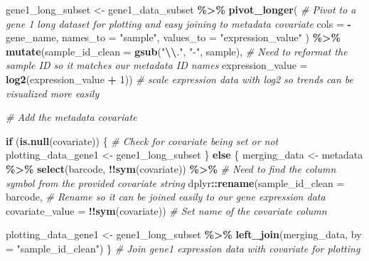 \documentclass[
]{article}
\newenvironment{Shaded}{\begin{snugshade}}{\end{snugshade}}
\newcommand{\AttributeTok}[1]{\textcolor[rgb]{0.13,0.29,0.53}{#1}}
\newcommand{\CommentTok}[1]{\textcolor[rgb]{0.56,0.35,0.01}{\textit{#1}}}
\newcommand{\ControlFlowTok}[1]{\textcolor[rgb]{0.13,0.29,0.53}{\textbf{#1}}}
\newcommand{\DecValTok}[1]{\textcolor[rgb]{0.00,0.00,0.81}{#1}}
\newcommand{\FunctionTok}[1]{\textcolor[rgb]{0.13,0.29,0.53}{\textbf{#1}}}
\newcommand{\NormalTok}[1]{#1}
\newcommand{\OtherTok}[1]{\textcolor[rgb]{0.56,0.35,0.01}{#1}}
\newcommand{\SpecialCharTok}[1]{\textcolor[rgb]{0.81,0.36,0.00}{\textbf{#1}}}
\newcommand{\StringTok}[1]{\textcolor[rgb]{0.31,0.60,0.02}{#1}}
\begin{document}
\begin{Shaded}
\begin{Highlighting}[]
\NormalTok{  gene1\_long\_subset }\OtherTok{\textless{}{-}}\NormalTok{ gene1\_data\_subset }\SpecialCharTok{\%\textgreater{}\%}
  \FunctionTok{pivot\_longer}\NormalTok{( }\CommentTok{\# Pivot to a gene 1 long dataset for plotting and easy joining to metadata covariate}
    \AttributeTok{cols =} \SpecialCharTok{{-}}\NormalTok{gene\_name,}
    \AttributeTok{names\_to =} \StringTok{"sample"}\NormalTok{,}
    \AttributeTok{values\_to =} \StringTok{"expression\_value"}
\NormalTok{  ) }\SpecialCharTok{\%\textgreater{}\%} 
  \FunctionTok{mutate}\NormalTok{(}\AttributeTok{sample\_id\_clean =} \FunctionTok{gsub}\NormalTok{(}\StringTok{"}\SpecialCharTok{\textbackslash{}\textbackslash{}}\StringTok{."}\NormalTok{, }\StringTok{"{-}"}\NormalTok{, sample), }\CommentTok{\# Need to reformat the sample ID so it matches our metadata ID names}
         \AttributeTok{expression\_value =} \FunctionTok{log2}\NormalTok{(expression\_value }\SpecialCharTok{+} \DecValTok{1}\NormalTok{)) }\CommentTok{\# scale expression data with log2 so trends can be visualized more easily}
  
  \CommentTok{\# Add the metadata covariate}
  
  \ControlFlowTok{if}\NormalTok{ (}\FunctionTok{is.null}\NormalTok{(covariate)) \{ }\CommentTok{\# Check for covariate being set or not}
\NormalTok{  plotting\_data\_gene1 }\OtherTok{\textless{}{-}}\NormalTok{ gene1\_long\_subset}
\NormalTok{  \} }\ControlFlowTok{else}\NormalTok{ \{}
\NormalTok{  merging\_data }\OtherTok{\textless{}{-}}\NormalTok{ metadata }\SpecialCharTok{\%\textgreater{}\%}
    \FunctionTok{select}\NormalTok{(barcode, }\SpecialCharTok{!!}\FunctionTok{sym}\NormalTok{(covariate)) }\SpecialCharTok{\%\textgreater{}\%} \CommentTok{\# Need to find the column symbol from the provided covariate string}
\NormalTok{    dplyr}\SpecialCharTok{::}\FunctionTok{rename}\NormalTok{(}\AttributeTok{sample\_id\_clean =}\NormalTok{ barcode, }\CommentTok{\# Rename so it can be joined easily to our gene expression data}
           \AttributeTok{covariate\_value =} \SpecialCharTok{!!}\FunctionTok{sym}\NormalTok{(covariate)) }\CommentTok{\# Set name of the covariate column }

\NormalTok{  plotting\_data\_gene1 }\OtherTok{\textless{}{-}}\NormalTok{ gene1\_long\_subset }\SpecialCharTok{\%\textgreater{}\%}
    \FunctionTok{left\_join}\NormalTok{(merging\_data, }\AttributeTok{by =} \StringTok{"sample\_id\_clean"}\NormalTok{)}
\NormalTok{  \} }\CommentTok{\# Join gene1 expression data with covariate for plotting}
  

\end{Highlighting}
\end{Shaded}
\end{document}
